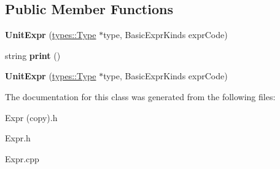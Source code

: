 \subsection*{Public Member Functions}
\begin{DoxyCompactItemize}
\item 
\mbox{\label{classspan_1_1ir_1_1expr_1_1UnitExpr_ae2c878acd6b02e8dad37b1eb56ea1b0c}} 
{\bfseries Unit\+Expr} (\hyperlink{classspan_1_1ir_1_1types_1_1Type}{types\+::\+Type} $\ast$type, Basic\+Expr\+Kinds expr\+Code)
\item 
\mbox{\label{classspan_1_1ir_1_1expr_1_1UnitExpr_ada7cb68c9e604601bc18eb3360f2400e}} 
string {\bfseries print} ()
\item 
\mbox{\label{classspan_1_1ir_1_1expr_1_1UnitExpr_a42470246142a1b19a53a4afa9eae0872}} 
{\bfseries Unit\+Expr} (\hyperlink{classspan_1_1ir_1_1types_1_1Type}{types\+::\+Type} $\ast$type, Basic\+Expr\+Kinds expr\+Code)
\end{DoxyCompactItemize}


The documentation for this class was generated from the following files\+:\begin{DoxyCompactItemize}
\item 
Expr (copy).\+h\item 
Expr.\+h\item 
Expr.\+cpp\end{DoxyCompactItemize}
